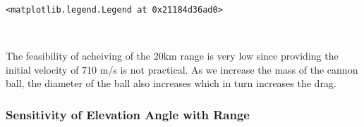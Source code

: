 \documentclass[11pt]{article}
\makeatletter
\newcommand{\boxspacing}{\kern\kvtcb@left@rule\kern\kvtcb@boxsep}
\newcommand{\prompt}[4]{
        {\ttfamily\llap{{\color{#2}[#3]:\hspace{3pt}#4}}\vspace{-\baselineskip}}
    }
\makeatother
\begin{document}
            \begin{tcolorbox}[breakable, size=fbox, boxrule=.5pt, pad at break*=1mm, opacityfill=0]
\prompt{Out}{outcolor}{95}{\boxspacing}
\begin{Verbatim}[commandchars=\\\{\}]
<matplotlib.legend.Legend at 0x21184d36ad0>
\end{Verbatim}
\end{tcolorbox}
        
    \begin{center}
    \end{center}
    { \hspace*{\fill} \\}
    
    The feasibility of acheiving of the 20km range is very low since
providing the initial velocity of 710 m/s is not practical. As we
increase the mass of the cannon ball, the diameter of the ball also
increases which in turn increases the drag.

    \hypertarget{sensitivity-of-elevation-angle-with-range}{%
\subsubsection{Sensitivity of Elevation Angle with
Range}\label{sensitivity-of-elevation-angle-with-range}}
\end{document}
